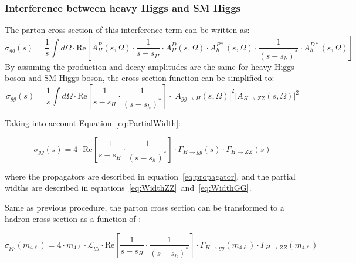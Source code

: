 \subsubsection{Interference between heavy Higgs and SM Higgs}

The parton cross section of this interference term can be written as:
\begingroup
\small
\begin{equation}
	\sigma_{gg} (s) = \frac{1}{s} \int d \Omega \cdot \mathrm{Re} \left [A_H^P(s,\Omega)\cdot  \frac{1}{s-s_H}   \cdot A_H^D(s,\Omega) \cdot A_h^{P*}(s,\Omega)\cdot  \frac{1}{(s-s_h)^*}   \cdot A_h^{D*}(s,\Omega)   \right ]
\end{equation}
By assuming the production and decay amplitudes are the same for heavy Higgs boson and SM Higgs boson, the cross section function can be simplified to:
\begin{equation}
    \sigma_{gg} (s) = \frac{1}{s}  \int d \Omega \cdot \mathrm{Re} \left [\frac{1}{s-s_H} \cdot  \frac{1}{(s-s_h)^*} \right ] \cdot \left | A_{gg \to H}(s,\Omega) \right |^2 \left | A_{H \to ZZ}(s,\Omega) \right |^2
\end{equation}
\endgroup

Taking into account Equation~\ref{eq:PartialWidth}:

\begin{equation} \label{eq:HhInterference_2}
    \sigma_{gg} (s) = 4 \cdot \mathrm{Re} \left [\frac{1}{s-s_H} \cdot  \frac{1}{(s-s_h)^*} \right ] \cdot  \Gamma_{H \to gg} (s) \cdot \Gamma_{H \to ZZ} (s)
\end{equation}

where the propagators are described in equation~\ref{eq:propagator}, and the partial widths are described in equations~\ref{eq:WidthZZ}~and~\ref{eq:WidthGG}.

Same as previous procedure, the parton cross section can be transformed to a hadron cross section as a function of \mfl:

\begin{equation} \label{eq:HhInterference}
    \sigma_{pp} (m_{4\ell}) = 4 \cdot m_{4\ell} \cdot  \mathcal{L}_{gg}\cdot \mathrm{Re} \left [\frac{1}{s-s_H} \cdot  \frac{1}{(s-s_h)^*} \right ] \cdot  \Gamma_{H \to gg} (m_{4\ell}) \cdot \Gamma_{H \to ZZ} (m_{4\ell})
\end{equation}

%


